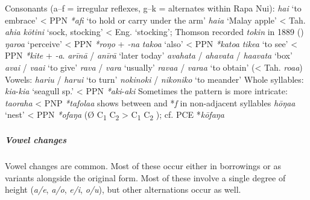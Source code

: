 \ea
Consonants (a–f = irregular reflexes, g–k = alternates within Rapa Nui): 
\ea
\textit{ha{\ꞌ}i} ‘to embrace’ {\textless} PPN \textit{*{\ꞌ}afi} ‘to hold or carry under the arm’
\ex
\textit{ha{\ꞌ}i{\ꞌ}a} ‘Malay apple’ {\textless} Tah. \textit{{\ꞌ}ahi{\ꞌ}a}
\ex
\textit{kōtini} ‘sock, stocking’ {\textless} Eng. ‘stocking’; Thomson recorded \textit{tokin} in 1889 (\citealt[157]{Thomson1980})
\ex
\textit{ŋaro{\ꞌ}a} ‘perceive’ {\textless} PPN \textit{*roŋo} + \textit{{}-na}
\ex
\textit{tako{\ꞌ}a} ‘also’ {\textless} PPN \textit{*katoa}
\ex
\textit{tike{\ꞌ}a} ‘to see’ {\textless} PPN \textit{*kite} + \textit{\nobreakdash-a}. 
\ex
\textit{{\ꞌ}arīnā} / \textit{{\ꞌ}anīrā} ‘later today’
\ex
\textit{{\ꞌ}avahata} / \textit{ahavata} / \textit{ha{\ꞌ}avata} ‘box’
\ex
\textit{{\ꞌ}avai} / \textit{va{\ꞌ}ai} ‘to give’
\ex
\textit{rava} / \textit{vara} ‘usually’
\ex
\textit{\mbox{rava{\ꞌ}a}} / \textit{vara{\ꞌ}a} ‘to obtain’ ({\textless} Tah. \textit{roa{\ꞌ}a})
\z
\z
\ea
Vowels: 
\ea
\textit{hariu} / \textit{harui} ‘to turn’
\ex
\textit{nokinoki} / \textit{nikoniko} ‘to meander’
\z
\z
\ea
Whole syllables: 
\ea
\textit{kia}{}-\textit{kia} ‘seagull sp.’ {\textless} PPN \textit{*}\textit{aki}{}-\textit{aki}
\z
\z
\ea
{}Sometimes the pattern is more intricate: 
\ea
\textit{ta{\ꞌ}oraha} {\textless} PNP \textit{*}\textit{tafola{\ꞌ}a} shows  between \textit{{\ꞌ}} and *\textit{f} in non-adjacent syllables
\ex
\textit{hōŋa{\ꞌ}a} ‘nest’ {\textless} PPN \textit{*ofaŋa} (Ø C\textsubscript{1} C\textsubscript{2} > C\textsubscript{1} C\textsubscript{2} \textit{{\ꞌ}}); cf. PCE *\textit{kōfaŋa}
\z
\z
{}
\subparagraph{Vowel changes} Vowel changes are common. Most of these occur either in  borrowings or as variants alongside the original form. Most of these involve a single degree of height (\textit{a/e}, \textit{a/o}, \textit{e/i}, \textit{o/u}), but other alternations occur as well.

